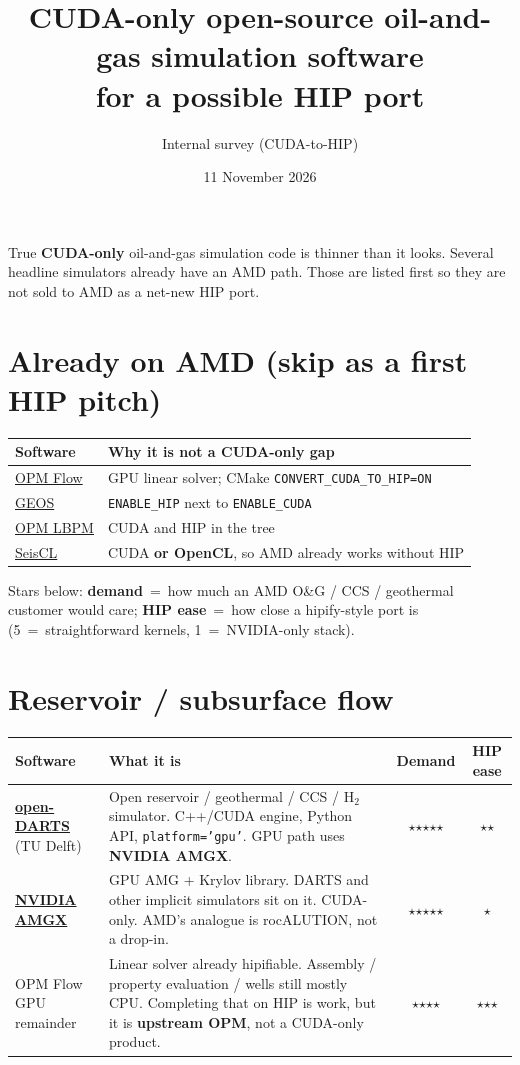 \documentclass[11pt,a4paper]{article}
\title{CUDA-only open-source oil-and-gas simulation software\\
for a possible HIP port}
\author{Internal survey (CUDA-to-HIP)}
\date{11 November 2026}
\begin{document}
\maketitle

\noindent
True \textbf{CUDA-only} oil-and-gas simulation code is thinner than it looks.
Several headline simulators already have an AMD path.
Those are listed first so they are not sold to AMD as a net-new HIP port.

\section*{Already on AMD (skip as a first HIP pitch)}

\begin{longtable}{@{}p{}p{}@{}}
\toprule
Software & Why it is not a CUDA-only gap \\
\midrule
\endhead
\href{https://github.com/OPM/opm-simulators}{OPM Flow} &
GPU linear solver; CMake \texttt{CONVERT\_CUDA\_TO\_HIP=ON} \\
\href{https://github.com/GEOS-DEV/GEOS}{GEOS} &
\texttt{ENABLE\_HIP} next to \texttt{ENABLE\_CUDA} \\
\href{https://github.com/OPM/LBPM/}{OPM LBPM} &
CUDA and HIP in the tree \\
\href{https://github.com/gfabieno/SeisCL/}{SeisCL} &
CUDA \textbf{or OpenCL}, so AMD already works without HIP \\
\bottomrule
\end{longtable}

Stars below: \textbf{demand}~=~how much an AMD O\&G / CCS / geothermal customer would care;
\textbf{HIP ease}~=~how close a hipify-style port is
(5~=~straightforward kernels, 1~=~NVIDIA-only stack).

\section{Reservoir / subsurface flow}

\begin{longtable}{@{}p{}p{}cc@{}}
\toprule
Software & What it is & Demand & HIP ease \\
\midrule
\endhead
\href{https://gitlab.com/open-darts/open-darts}{\textbf{open-DARTS}}
(TU Delft) &
Open reservoir / geothermal / CCS / H$_2$ simulator.
C++/CUDA engine, Python API, \texttt{platform='gpu'}.
GPU path uses \textbf{NVIDIA AMGX}. &
$\star$$\star$$\star$$\star$$\star$ &
$\star$$\star$ \\
\href{https://github.com/NVIDIA/AMGX}{\textbf{NVIDIA AMGX}} &
GPU AMG + Krylov library.
DARTS and other implicit simulators sit on it.
CUDA-only.
AMD's analogue is rocALUTION, not a drop-in. &
$\star$$\star$$\star$$\star$$\star$ &
$\star$ \\
OPM Flow GPU remainder &
Linear solver already hipifiable.
Assembly / property evaluation / wells still mostly CPU.
Completing that on HIP is work, but it is \textbf{upstream OPM},
not a CUDA-only product. &
$\star$$\star$$\star$$\star$ &
$\star$$\star$$\star$ \\
\bottomrule
\end{longtable}
\end{document}
